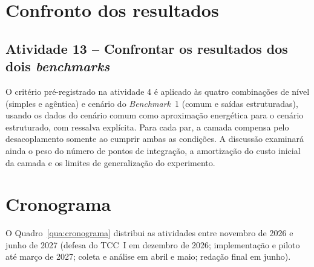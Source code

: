 \section{Confronto dos resultados}
\label{sec:confronto}

\subsection{Atividade 13 -- Confrontar os resultados dos dois \textit{benchmarks}}
\label{subsec:at-confronto}

O critério pré-registrado na atividade 4 é aplicado às quatro combinações de
nível (simples e agêntica) e cenário do \textit{Benchmark}~1 (comum e saídas
estruturadas), usando os dados do cenário comum como aproximação energética
para o cenário estruturado, com ressalva explícita. Para cada par, a camada
compensa pelo desacoplamento somente ao cumprir ambas as condições. A discussão
examinará ainda o peso do número de pontos de integração, a amortização do
custo inicial da camada e os limites de generalização do experimento.

\section{Cronograma}
\label{sec:cronograma}

O Quadro~\ref{qua:cronograma} distribui as atividades entre novembro de 2026 e
junho de 2027 (defesa do TCC~I em dezembro de 2026; implementação e piloto até
março de 2027; coleta e análise em abril e maio; redação final em junho).

